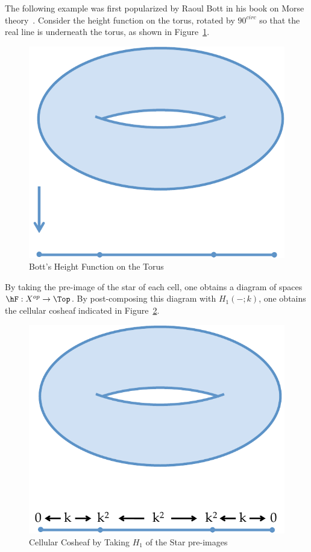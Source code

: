 \begin{ex}
 The following example was first popularized by Raoul Bott in his book on Morse theory~\cite{macpherson}. Consider the height function on the torus, rotated by $90^{circ}$ so that the real line is underneath the torus, as shown in Figure~\ref{fig:bott_torus}.
\begin{figure}
  \centering
\includegraphics[width=.7\textwidth]{bott_torus_90.pdf}
\caption{Bott's Height Function on the Torus}
\label{fig:bott_torus}
 \end{figure}
 By taking the pre-image of the star of each cell, one obtains a diagram of spaces $\hF:X^{op}\to\Top$. By post-composing this diagram with $H_1(-;k)$, one obtains the cellular cosheaf indicated in Figure~\ref{fig:bott_torus_cosheaf}.
  \begin{figure}[ht]
  \centering
\includegraphics[width=.7\textwidth]{morse_torus_cosheaf.pdf}
\caption{Cellular Cosheaf by Taking $H_1$ of the Star pre-images}
\label{fig:bott_torus_cosheaf}
 \end{figure}
\end{ex}

